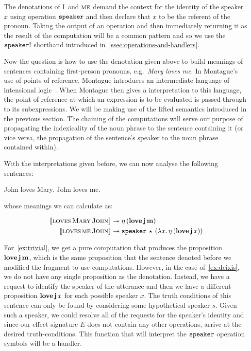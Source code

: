 The denotations of $\textsc{I}$ and $\textsc{me}$ demand the context for the
identity of the speaker $x$ using operation $\mathtt{speaker}$ and then declare
that $x$ to be the referent of the pronoun. Taking the output of an
operation and then immediately returning it as the result of the
computation will be a common pattern and so we use the $\mathtt{speaker}!$
shorthand introduced in~\ref{ssec:operations-and-handlers}.

Now the question is how to use the denotation given above to build meanings
of sentences containing first-person pronouns, e.g.\ \emph{Mary loves
  me}. In Montague's use of points of reference, Montague introduces an
intermediate language of intensional logic~\cite{montague1973proper}. When
Montague then gives a interpretation to this language, the point of
reference at which an expression is to be evaluated is passed through to
its subexpressions. We will be making use of the lifted semantics
introduced in the previous section. The chaining of the computations will
serve our purpose of propagating the indexicality of the noun phrase to the
sentence containing it (or vice versa, the propagation of the sentence's
speaker to the noun phrase contained within).

With the interpretations given before, we can now analyse the following
sentences:

\begin{exe}
  \ex John loves Mary. \label{ex:trivial}
  \ex John loves me. \label{ex:deixis}
\end{exe}

whose meanings we can calculate as:

\NoChapterPrefix
\begin{align}
  \llbracket \textsc{loves}\,\textsc{Mary}\,\textsc{John} \rrbracket & \twoheadrightarrow 
  \eta\,(\textbf{love}\,\textbf{j}\,\textbf{m}) \\
  \llbracket \textsc{loves}\,\textsc{me}\,\textsc{John} \rrbracket & \twoheadrightarrow
  \mathtt{speaker}\,\star\,(\lambda x.\, \eta\,(\textbf{love}\,\textbf{j}\,x))
\end{align}
\ChapterPrefix

For~\eqref{ex:trivial}, we get a pure computation that produces the
proposition $\textbf{love}\,\textbf{j}\,\textbf{m}$, which is the same
proposition that the sentence denoted before we modified the fragment to
use computations. However, in the case of~\eqref{ex:deixis}, we do not have
any single proposition as the denotation. Instead, we have a request to
identify the speaker of the utterance and then we have a different
proposition $\textbf{love}\,\textbf{j}\,x$ for each possible speaker
$x$. The truth conditions of this sentence can only be found by considering
some hypothetical speaker $s$. Given such a speaker, we could resolve all
of the requests for the speaker's identity and since our effect signature
$E$ does not contain any other operations, arrive at the desired
truth-conditions. This function that will interpret the $\mathtt{speaker}$
operation symbols will be a handler.

